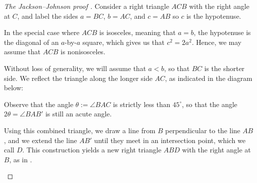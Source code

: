 \begin{proof}[The Jackson--Johnson proof \cite{jacksonjohnson2024}]
  Consider a right triangle $ACB$ with the right angle at $C$, and label the sides $a=BC$, $b=AC$, and $c=AB$ so $c$ is the hypotenuse.

  In the special case where $ACB$ is isosceles, meaning that $a=b$, the hypotenuse is the diagonal of an $a$-by-$a$ square, which gives us that $c^2=2a^2$. Hence, we may assume that $ACB$ is nonisosceles.

  Without loss of generality, we will assume that $a<b$, so that $BC$ is the shorter side. We reflect the triangle along the longer side $AC$, as indicated in the diagram below:
  \begin{figure}[H]
    \centering
  \end{figure}

  Observe that the angle $\theta := \angle BAC$ is strictly less than $45^\circ$, so that the angle $2\theta = \angle BAB'$ is still an acute angle.

  Using this combined triangle, we draw a line from $B$ perpendicular to the line $AB$, and we extend the line $AB'$ until they meet in an intersection point, which we call $D$. This construction yields a new right triangle $ABD$ with the right angle at $B$, as in .
  \begin{figure}[t]
    \centering
\end{figure}
\end{proof}
